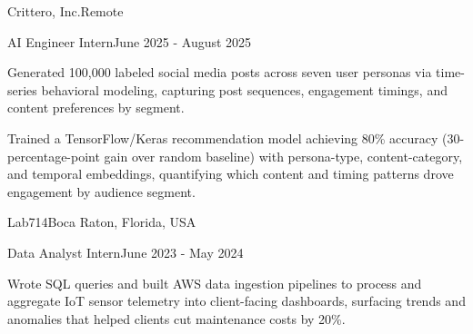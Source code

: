 \documentclass[10pt, letterpaper]{article}
\begin{document}
\vspace{\entrySpacing}
\begin{leadershipentry}{Crittero, Inc.}{Remote}
	\begin{positionentry}{AI Engineer Intern}{June 2025 - August 2025}
		\item Generated 100,000 labeled social media posts across seven user personas via time-series behavioral modeling, capturing post sequences, engagement timings, and content preferences by segment.
		\item Trained a TensorFlow/Keras recommendation model achieving 80\% accuracy (30-percentage-point gain over random baseline) with persona-type, content-category, and temporal embeddings, quantifying which content and timing patterns drove engagement by audience segment.
	\end{positionentry}
\end{leadershipentry}

\vspace{\entrySpacing}
\begin{leadershipentry}{Lab714}{Boca Raton, Florida, USA}
	\begin{positionentry}{Data Analyst Intern}{June 2023 - May 2024}
		\item Wrote SQL queries and built AWS data ingestion pipelines to process and aggregate IoT sensor telemetry into client-facing dashboards, surfacing trends and anomalies that helped clients cut maintenance costs by 20\%.
	\end{positionentry}
\end{leadershipentry}

\vspace{\headerSpacing}


\section{}
\end{document}
